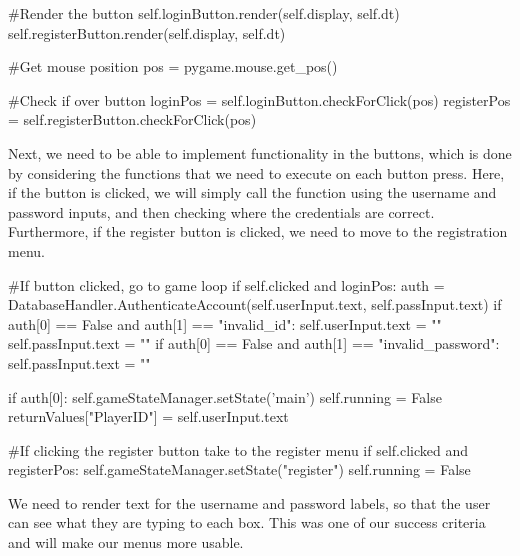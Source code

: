 \begin{mpy}
        #Render the button
        self.loginButton.render(self.display, self.dt)
        self.registerButton.render(self.display, self.dt)

        #Get mouse position
        pos = pygame.mouse.get_pos()

        #Check if over button
        loginPos = self.loginButton.checkForClick(pos)
        registerPos = self.registerButton.checkForClick(pos)
\end{mpy}

Next, we need to be able to implement functionality in the buttons, which is done by considering the functions that we need to execute on each button press. Here, if the button is clicked, we will simply call the  function using the username and password inputs, and then checking where the credentials are correct. Furthermore, if the register button is clicked, we need to move to the registration menu.

\begin{mpy}
        #If button clicked, go to game loop
        if self.clicked and loginPos:
            auth = DatabaseHandler.AuthenticateAccount(self.userInput.text, self.passInput.text)
            if auth[0] == False and auth[1] == "invalid_id":
                self.userInput.text = ""
                self.passInput.text = ""
            if auth[0] == False and auth[1] == "invalid_password":
                self.passInput.text = ""

            if auth[0]:
                self.gameStateManager.setState('main')
                self.running = False
                returnValues["PlayerID"] = self.userInput.text


        #If clicking the register button take to the register menu
        if self.clicked and registerPos:
            self.gameStateManager.setState("register")
            self.running = False
\end{mpy}

We need to render text for the username and password labels, so that the user can see what they are typing to each box. This was one of our success criteria and will make our menus more usable.

